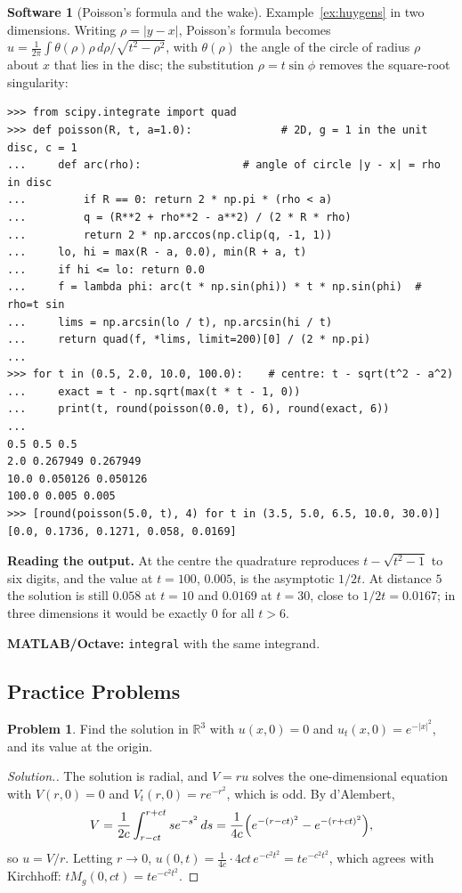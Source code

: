 \documentclass[11pt,a4paper]{article}
\numberwithin{equation}{section}
\theoremstyle{definition}
\newtheorem{software}[thm]{Software}
\newtheorem{problemx}{Problem}[subsection]
\newenvironment{problem}{\begin{problemx}}{\end{problemx}}
\newenvironment{solution}
  {\renewcommand{\qedsymbol}{}\begin{proof}[\textit{Solution}.]}
  {\end{proof}}
\begin{document}
\begin{software}[Poisson's formula and the wake]
\label{sw:poisson}
Example~\ref{ex:huygens} in two dimensions. Writing $\rho = |y - x|$, Poisson's formula becomes $u = \frac1{2\pi}\int\theta(\rho)\rho\,d\rho/\sqrt{t^2 - \rho^2}$, with $\theta(\rho)$ the angle of the circle of radius $\rho$ about $x$ that lies in the disc; the substitution $\rho = t\sin\phi$ removes the square-root singularity:
{\small\begin{verbatim}
>>> from scipy.integrate import quad
>>> def poisson(R, t, a=1.0):              # 2D, g = 1 in the unit disc, c = 1
...     def arc(rho):                # angle of circle |y - x| = rho in disc
...         if R == 0: return 2 * np.pi * (rho < a)
...         q = (R**2 + rho**2 - a**2) / (2 * R * rho)
...         return 2 * np.arccos(np.clip(q, -1, 1))
...     lo, hi = max(R - a, 0.0), min(R + a, t)
...     if hi <= lo: return 0.0
...     f = lambda phi: arc(t * np.sin(phi)) * t * np.sin(phi)  # rho=t sin
...     lims = np.arcsin(lo / t), np.arcsin(hi / t)
...     return quad(f, *lims, limit=200)[0] / (2 * np.pi)
...
>>> for t in (0.5, 2.0, 10.0, 100.0):    # centre: t - sqrt(t^2 - a^2)
...     exact = t - np.sqrt(max(t * t - 1, 0))
...     print(t, round(poisson(0.0, t), 6), round(exact, 6))
...
0.5 0.5 0.5
2.0 0.267949 0.267949
10.0 0.050126 0.050126
100.0 0.005 0.005
>>> [round(poisson(5.0, t), 4) for t in (3.5, 5.0, 6.5, 10.0, 30.0)]
[0.0, 0.1736, 0.1271, 0.058, 0.0169]
\end{verbatim}}
\textbf{Reading the output.} At the centre the quadrature reproduces $t - \sqrt{t^2 - 1}$ to six digits, and the value at $t = 100$, $0.005$, is the asymptotic $1/2t$. At distance $5$ the solution is still $0.058$ at $t = 10$ and $0.0169$ at $t = 30$, close to $1/2t = 0.0167$; in three dimensions it would be exactly $0$ for all $t > 6$.

\textbf{MATLAB/Octave:} \texttt{integral} with the same integrand.
\end{software}

\subsection{Practice Problems}

\begin{problem}
Find the solution in $\mathbb R^3$ with $u(x, 0) = 0$ and $u_t(x, 0) = e^{-|x|^2}$, and its value at the origin.
\end{problem}

\begin{solution}
The solution is radial, and $V = ru$ solves the one-dimensional equation with $V(r, 0) = 0$ and $V_t(r, 0) = re^{-r^2}$, which is odd. By d'Alembert,
\[
V = \frac1{2c}\int_{r - ct}^{r + ct}se^{-s^2}\,ds = \frac1{4c}\Bigl(e^{-(r - ct)^2} - e^{-(r + ct)^2}\Bigr) ,
\]
so $u = V/r$. Letting $r \to 0$, $u(0, t) = \frac1{4c}\cdot 4ct\,e^{-c^2t^2} = te^{-c^2t^2}$, which agrees with Kirchhoff: $tM_g(0, ct) = te^{-c^2t^2}$.
\end{solution}
\end{document}
